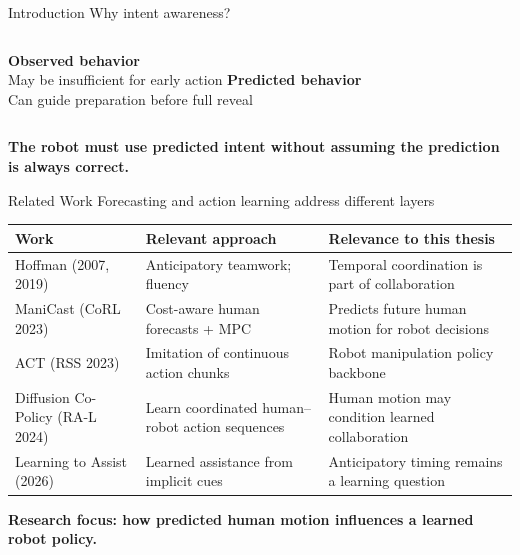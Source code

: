 \documentclass[11pt]{beamer}
\newcommand{\keyidea}[1]{\vspace{0.12cm}\begin{center}\small\color{HN}\bfseries #1\end{center}}
\begin{document}
\begin{frame}{Introduction \hfill Why intent awareness?}
\centering
{}
\vspace{0.18cm}
\begin{columns}[T]
\centering\small \textbf{Observed behavior}\\May be insufficient for early action
\centering\small \textbf{Predicted behavior}\\Can guide preparation before full reveal
\end{columns}
\keyidea{The robot must use predicted intent without assuming the prediction is always correct.}
\end{frame}

\begin{frame}{Related Work \hfill Forecasting and action learning address different layers}
\centering\scriptsize
\renewcommand{\arraystretch}{1.53}
\begin{tabular}{p{2.18cm}p{2.88cm}p{3.75cm}}
\toprule
\textbf{Work} & \textbf{Relevant approach} & \textbf{Relevance to this thesis}\\
\midrule
Hoffman (2007, 2019) & Anticipatory teamwork; fluency & Temporal coordination is part of collaboration\\
ManiCast (CoRL 2023) & Cost-aware human forecasts + MPC & Predicts future human motion for robot decisions\\
ACT (RSS 2023) & Imitation of continuous action chunks & Robot manipulation policy backbone\\
Diffusion Co-Policy (RA-L 2024) & Learn coordinated human--robot action sequences & Human motion may condition learned collaboration\\
Learning to Assist (2026) & Learned assistance from implicit cues & Anticipatory timing remains a learning question\\
\bottomrule
\end{tabular}
\vspace{0.21cm}
\begin{center}\small\bfseries
Research focus: how predicted human motion influences a learned robot policy.
\end{center}

\end{frame}
\end{document}
